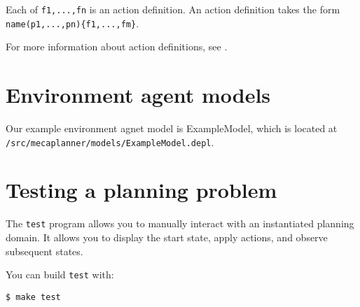 \documentclass{article}
\begin{document}
Each of \verb|f1,...,fn| is an action definition. An action definition
takes the form \verb|name(p1,...,pn){f1,...,fm}|.

For more information about action definitions, see
\cite{??}.
 


\section{Environment agent models}

Our example environment agnet model is ExampleModel, which is located at\\
\texttt{/src/mecaplanner/models/ExampleModel.depl}.




\section{Testing a planning problem}
The \verb|test| program allows you to manually interact with an instantiated planning domain.
It allows you to display the start state, apply actions, and observe subsequent
states.

You can build \verb|test| with:
\begin{lstlisting}
$ make test
\end{lstlisting}


\end{document}
